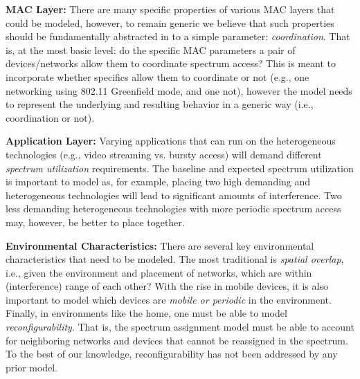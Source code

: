 
\smallskip

\textbf{MAC Layer:}  There are many specific properties of various MAC layers that could be modeled, however, to remain generic we believe that such properties should be fundamentally abstracted in to a simple parameter: \emph{coordination}.  That is, at the most basic level:  do the specific MAC parameters a pair of devices/networks allow them to coordinate spectrum access?  This is meant to incorporate whether specifics allow them to coordinate or not (e.g., one networking using 802.11 Greenfield mode, and one not), however the model needs to represent the underlying and resulting behavior in a generic way (i.e., coordination or not).

\smallskip

\textbf{Application Layer:} Varying applications that can run on the heterogeneous technologies (e.g., video streaming vs. bursty access) will demand different \emph{spectrum utilization} requirements.  The baseline and expected spectrum utilization is important to model as, for example, placing two high demanding and heterogeneous technologies will lead to significant amounts of interference.  Two less demanding heterogeneous technologies with more periodic spectrum access may, however, be better to place together. 


\smallskip

\textbf{Environmental Characteristics:} There are several key environmental characteristics that need to be modeled.  The most traditional is \emph{spatial overlap}, i.e., given the environment and placement of networks, which are within (interference) range of each other?  With the rise in mobile devices, it is also important to model which devices are \emph{mobile or periodic} in the environment. Finally,  in environments like the home, one must be able to model \emph{reconfigurability}.  That is, the spectrum assignment model must be able to account for neighboring networks and devices that cannot be reassigned in the spectrum.  To the best of our knowledge, reconfigurability has not been addressed by any prior model.



